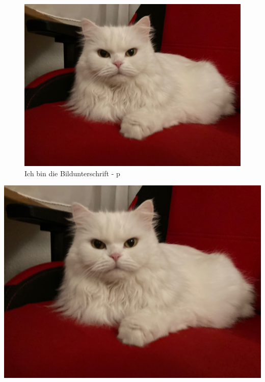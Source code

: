 \documentclass[12pt,ngerman,parskip=half]{scrartcl}
\begin{document}
\begin{figure}[p] %
\includegraphics[width=\textwidth]{Bilder/Katze}
\caption{Ich bin die Bildunterschrift - p}
\end{figure}

\blindtext[4]\vspace*{1em}


\includegraphics[width=\textwidth]{Bilder/Katze}
\end{document}

